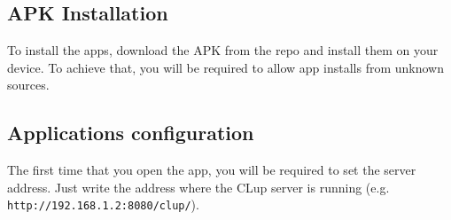 \subsection{APK Installation}
To install the apps, download the APK from the repo and install them on your device.\newline
To achieve that, you will be required to allow app installs from unknown sources.\newline
\subsection{Applications configuration}
The first time that you open the app, you will be required to set the server address.\newline
Just write the address where the CLup server is running (e.g. \verb|http://192.168.1.2:8080/clup/|).
